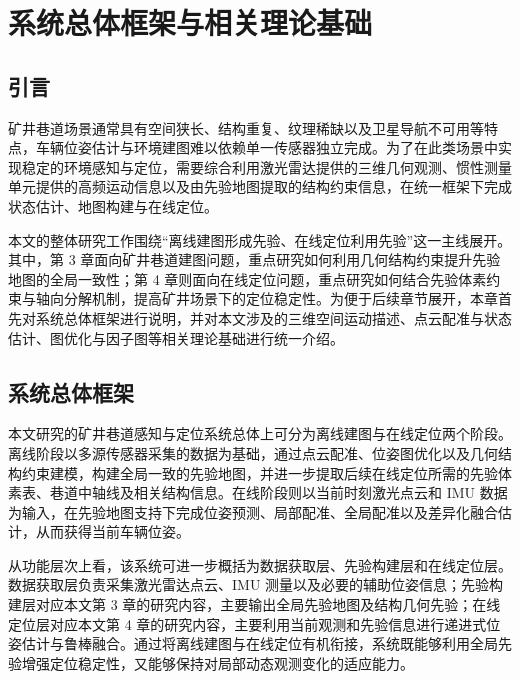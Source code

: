 
\chapter{系统总体框架与相关理论基础}

\label{chap:framework_theory}

\section{引言}

矿井巷道场景通常具有空间狭长、结构重复、纹理稀缺以及卫星导航不可用等特点，车辆位姿估计与环境建图难以依赖单一传感器独立完成。为了在此类场景中实现稳定的环境感知与定位，需要综合利用激光雷达提供的三维几何观测、惯性测量单元提供的高频运动信息以及由先验地图提取的结构约束信息，在统一框架下完成状态估计、地图构建与在线定位。

本文的整体研究工作围绕“离线建图形成先验、在线定位利用先验”这一主线展开。其中，第 3 章面向矿井巷道建图问题，重点研究如何利用几何结构约束提升先验地图的全局一致性；第 4 章则面向在线定位问题，重点研究如何结合先验体素约束与轴向分解机制，提高矿井场景下的定位稳定性。为便于后续章节展开，本章首先对系统总体框架进行说明，并对本文涉及的三维空间运动描述、点云配准与状态估计、图优化与因子图等相关理论基础进行统一介绍。

\section{系统总体框架}

本文研究的矿井巷道感知与定位系统总体上可分为离线建图与在线定位两个阶段。离线阶段以多源传感器采集的数据为基础，通过点云配准、位姿图优化以及几何结构约束建模，构建全局一致的先验地图，并进一步提取后续在线定位所需的先验体素表、巷道中轴线及相关结构信息。在线阶段则以当前时刻激光点云和 IMU 数据为输入，在先验地图支持下完成位姿预测、局部配准、全局配准以及差异化融合估计，从而获得当前车辆位姿。

从功能层次上看，该系统可进一步概括为数据获取层、先验构建层和在线定位层。数据获取层负责采集激光雷达点云、IMU 测量以及必要的辅助位姿信息；先验构建层对应本文第 3 章的研究内容，主要输出全局先验地图及结构几何先验；在线定位层对应本文第 4 章的研究内容，主要利用当前观测和先验信息进行递进式位姿估计与鲁棒融合。通过将离线建图与在线定位有机衔接，系统既能够利用全局先验增强定位稳定性，又能够保持对局部动态观测变化的适应能力。

